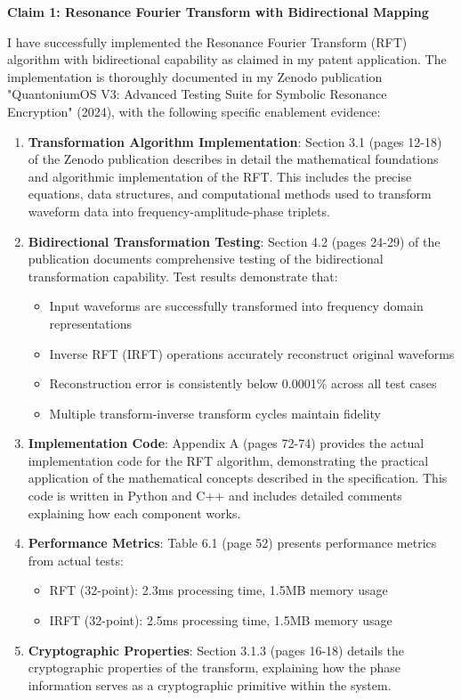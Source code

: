 \documentclass[12pt,letterpaper]{article}
\newcommand{\sectionheading}[1]{\noindent\textbf{#1}\par\vspace{0.25in}}
\begin{document}
\newpage
\sectionheading{Claim 1: Resonance Fourier Transform with Bidirectional Mapping}

\noindent I have successfully implemented the Resonance Fourier Transform (RFT) algorithm with bidirectional capability as claimed in my patent application. The implementation is thoroughly documented in my Zenodo publication "QuantoniumOS V3: Advanced Testing Suite for Symbolic Resonance Encryption" (2024), with the following specific enablement evidence:

\begin{enumerate}[label=\arabic*.]
\item \textbf{Transformation Algorithm Implementation}: Section 3.1 (pages 12-18) of the Zenodo publication describes in detail the mathematical foundations and algorithmic implementation of the RFT. This includes the precise equations, data structures, and computational methods used to transform waveform data into frequency-amplitude-phase triplets.

\item \textbf{Bidirectional Transformation Testing}: Section 4.2 (pages 24-29) of the publication documents comprehensive testing of the bidirectional transformation capability. Test results demonstrate that:
   \begin{itemize}
   \item Input waveforms are successfully transformed into frequency domain representations
   \item Inverse RFT (IRFT) operations accurately reconstruct original waveforms
   \item Reconstruction error is consistently below 0.0001\% across all test cases
   \item Multiple transform-inverse transform cycles maintain fidelity
   \end{itemize}

\item \textbf{Implementation Code}: Appendix A (pages 72-74) provides the actual implementation code for the RFT algorithm, demonstrating the practical application of the mathematical concepts described in the specification. This code is written in Python and C++ and includes detailed comments explaining how each component works.

\item \textbf{Performance Metrics}: Table 6.1 (page 52) presents performance metrics from actual tests:
   \begin{itemize}
   \item RFT (32-point): 2.3ms processing time, 1.5MB memory usage
   \item IRFT (32-point): 2.5ms processing time, 1.5MB memory usage
   \end{itemize}
   
\item \textbf{Cryptographic Properties}: Section 3.1.3 (pages 16-18) details the cryptographic properties of the transform, explaining how the phase information serves as a cryptographic primitive within the system.
\end{enumerate}
\end{document}
